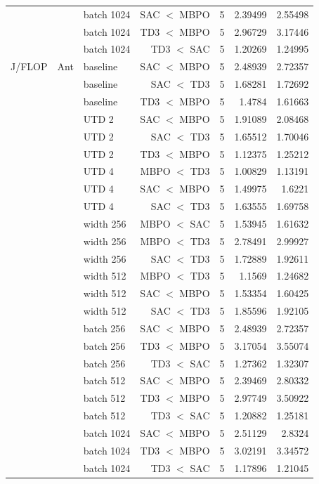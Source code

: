 {\begin{longtable}{@{}lllrrrr@{}}
     &  & batch 1024 & SAC $<$ MBPO & \num{5} & \num{2.39499} & \num{2.55498} \\
     &  & batch 1024 & TD3 $<$ MBPO & \num{5} & \num{2.96729} & \num{3.17446} \\
     &  & batch 1024 & TD3 $<$ SAC & \num{5} & \num{1.20269} & \num{1.24995} \\
    \midrule
    J/FLOP & Ant & baseline & SAC $<$ MBPO & \num{5} & \num{2.48939} & \num{2.72357} \\
     &  & baseline & SAC $<$ TD3 & \num{5} & \num{1.68281} & \num{1.72692} \\
     &  & baseline & TD3 $<$ MBPO & \num{5} & \num{1.4784} & \num{1.61663} \\
     &  & UTD 2 & SAC $<$ MBPO & \num{5} & \num{1.91089} & \num{2.08468} \\
     &  & UTD 2 & SAC $<$ TD3 & \num{5} & \num{1.65512} & \num{1.70046} \\
     &  & UTD 2 & TD3 $<$ MBPO & \num{5} & \num{1.12375} & \num{1.25212} \\
     &  & UTD 4 & MBPO $<$ TD3 & \num{5} & \num{1.00829} & \num{1.13191} \\
     &  & UTD 4 & SAC $<$ MBPO & \num{5} & \num{1.49975} & \num{1.6221} \\
     &  & UTD 4 & SAC $<$ TD3 & \num{5} & \num{1.63555} & \num{1.69758} \\
     &  & width 256 & MBPO $<$ SAC & \num{5} & \num{1.53945} & \num{1.61632} \\
     &  & width 256 & MBPO $<$ TD3 & \num{5} & \num{2.78491} & \num{2.99927} \\
     &  & width 256 & SAC $<$ TD3 & \num{5} & \num{1.72889} & \num{1.92611} \\
     &  & width 512 & MBPO $<$ TD3 & \num{5} & \num{1.1569} & \num{1.24682} \\
     &  & width 512 & SAC $<$ MBPO & \num{5} & \num{1.53354} & \num{1.60425} \\
     &  & width 512 & SAC $<$ TD3 & \num{5} & \num{1.85596} & \num{1.92105} \\
     &  & batch 256 & SAC $<$ MBPO & \num{5} & \num{2.48939} & \num{2.72357} \\
     &  & batch 256 & TD3 $<$ MBPO & \num{5} & \num{3.17054} & \num{3.55074} \\
     &  & batch 256 & TD3 $<$ SAC & \num{5} & \num{1.27362} & \num{1.32307} \\
     &  & batch 512 & SAC $<$ MBPO & \num{5} & \num{2.39469} & \num{2.80332} \\
     &  & batch 512 & TD3 $<$ MBPO & \num{5} & \num{2.97749} & \num{3.50922} \\
     &  & batch 512 & TD3 $<$ SAC & \num{5} & \num{1.20882} & \num{1.25181} \\
     &  & batch 1024 & SAC $<$ MBPO & \num{5} & \num{2.51129} & \num{2.8324} \\
     &  & batch 1024 & TD3 $<$ MBPO & \num{5} & \num{3.02191} & \num{3.34572} \\
     &  & batch 1024 & TD3 $<$ SAC & \num{5} & \num{1.17896} & \num{1.21045} \\
  \end{longtable}
}


